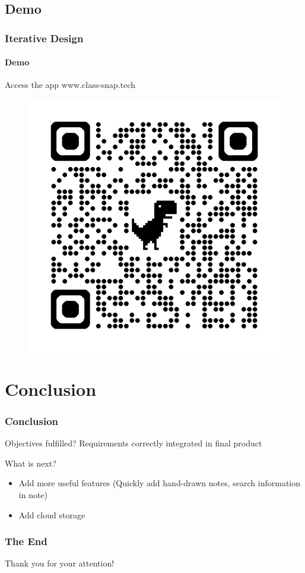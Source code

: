 \documentclass{beamer}
\begin{document}
	\subsection{Demo}
	\begin{frame}
		\frametitle{Iterative Design}
		\framesubtitle{Demo}
		
		\begin{alertblock}{Access the app}
			www.class-snap.tech
			
			\begin{figure}
				\centering
				\begin{minipage}{0.4\textwidth}
					\includegraphics[width=\linewidth]{qrcode}
				\end{minipage}
			\end{figure}
		\end{alertblock}
	\end{frame}
	
	\section{Conclusion}
	\begin{frame}
		\frametitle{Conclusion}
		
		\begin{alertblock}{Objectives fulfilled?}
			Requirements correctly integrated in final product
		\end{alertblock}
		
		\begin{alertblock}{What is next?}
			\begin{itemize}
				\item Add more useful features (Quickly add hand-drawn notes, search information in note)
				\item Add cloud storage
			\end{itemize}
		\end{alertblock}
	\end{frame}
	
	\begin{frame}
		\frametitle{The End}
		
		\centering
		Thank you for your attention!
	\end{frame}
\end{document}

